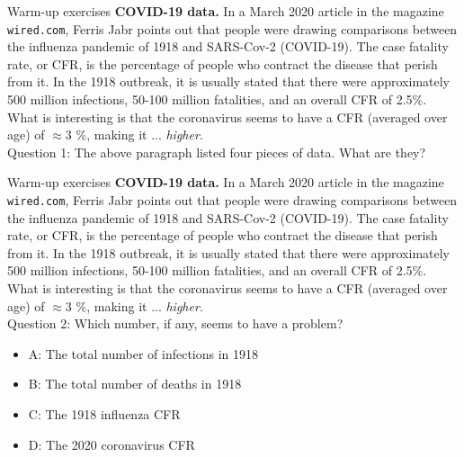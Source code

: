\documentclass{beamer}
\begin{document}
\begin{frame}{Warm-up exercises}
\small
\textbf{COVID-19 data.}  In a March 2020 article in the magazine \texttt{wired.com}, Ferris Jabr points out that people were drawing comparisons between the influenza pandemic of 1918 and SARS-Cov-2 (COVID-19).  The \alert{case fatality rate}, or CFR, is the percentage of people who contract the disease that perish from it.  In the 1918 outbreak, it is usually stated that there were approximately 500 million infections, 50-100 million fatalities, and an overall CFR of 2.5\%.  What is interesting is that the coronavirus seems to have a CFR (averaged over age) of $\approx 3$ \%, making it ... \textit{higher}. \\ \vspace{0.5 cm}
Question 1: The above paragraph listed four pieces of data.  What are they? \\
\end{frame}

\begin{frame}{Warm-up exercises}
\small
\textbf{COVID-19 data.}  In a March 2020 article in the magazine \texttt{wired.com}, Ferris Jabr points out that people were drawing comparisons between the influenza pandemic of 1918 and SARS-Cov-2 (COVID-19).  The \alert{case fatality rate}, or CFR, is the percentage of people who contract the disease that perish from it.  In the 1918 outbreak, it is usually stated that there were approximately 500 million infections, 50-100 million fatalities, and an overall CFR of 2.5\%.  What is interesting is that the coronavirus seems to have a CFR (averaged over age) of $\approx 3$ \%, making it ... \textit{higher}. \\ \vspace{0.5 cm}
Question 2: Which number, if any, seems to have a problem?
\begin{itemize}
\item A: The total number of infections in 1918
\item B: The total number of deaths in 1918
\item C: The 1918 influenza CFR
\item D: The 2020 coronavirus CFR
\end{itemize}
\end{frame}
\end{document}
